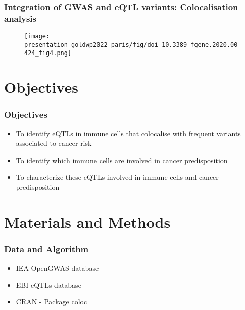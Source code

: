 \documentclass{beamer}
\begin{document}
\begin{frame}
\frametitle{Integration of GWAS and eQTL variants:  Colocalisation analysis}

\begin{figure}[!]
\texttt{[image: presentation\_goldwp2022\_paris/fig/doi\_10.3389\_fgene.2020.00424\_fig4.png]}
\end{figure}

\let\thefootnote\relax{}
\end{frame}


\section{Objectives} %

\begin{frame}
\frametitle{Objectives}

\begin{itemize}
\item To identify eQTLs in immune cells that colocalise with frequent variants associated to cancer risk
\item To identify which immune cells are involved in cancer predisposition
\item To characterize these eQTLs involved in immune cells and cancer predisposition
\end{itemize}
\end{frame}

\section{Materials and Methods}

\begin{frame}
\frametitle{Data and Algorithm}

\begin{itemize}
\item IEA OpenGWAS database
\item EBI eQTLs database
\item CRAN - Package coloc
\end{itemize}

\let\thefootnote\relax{}
\end{frame}
\end{document}
